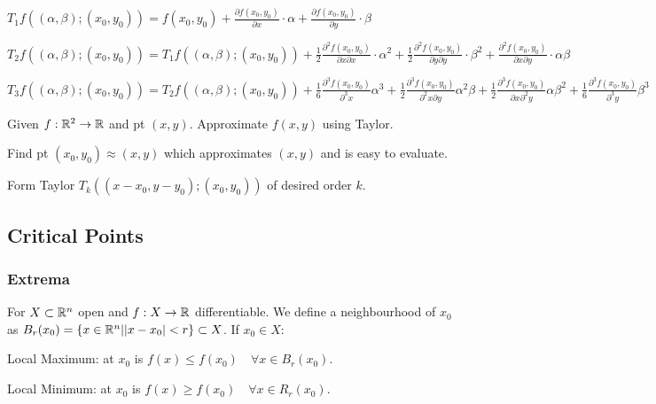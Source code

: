 \begin{compactitem}
    \item $T_1 f((\alpha, \beta); (x_0, y_0)) = f(x_0, y_0) + \frac{\partial f(x_0, y_0)}{\partial x} \cdot \alpha + \frac{\partial f(x_0, y_0)}{\partial y} \cdot \beta$
    \item $T_2 f((\alpha, \beta); (x_0, y_0)) = T_1 f((\alpha, \beta); (x_0, y_0)) + \frac{1}{2} \frac{\partial^2 f(x_0, y_0)}{\partial x \partial x} \cdot \alpha^2 + \frac{1}{2} \frac{\partial^2 f(x_0, y_0)}{\partial y \partial y} \cdot \beta^2 + \frac{\partial^2 f(x_0, y_0)}{\partial x \partial y} \cdot \alpha\beta$
    \item $T_3 f((\alpha, \beta); (x_0, y_0)) = T_2 f((\alpha, \beta); (x_0, y_0)) + \frac{1}{6} \frac{\partial^3 f(x_0, y_0)}{\partial^3 x} \alpha^3 + \frac{1}{2} \frac{\partial^3 f(x_0, y_0)}{\partial^2 x \partial y} \alpha^2 \beta + \frac{1}{2} \frac{\partial^3 f(x_0, y_0)}{\partial x \partial^2 y} \alpha \beta^2 + \frac{1}{6} \frac{\partial^3 f(x_0, y_0)}{\partial^3 y} \beta^3$
\end{compactitem}

Given $f: \mathbb{R}^2 \to \mathbb{R}$ and pt $(x, y)$. Approximate $f(x, y)$ using Taylor.

\begin{compactitem}
    \item Find pt $(x_0, y_0) \approx (x, y)$ which approximates $(x, y)$ and is easy to evaluate.
    \item Form Taylor $T_k((x - x_0, y - y_0); (x_0, y_0))$ of desired order $k$.
\end{compactitem}

\subsection{Critical Points}
\subsubsection{Extrema}
For $X \subset \mathbb{R}^n$ open and $f: X \to \mathbb{R}$ differentiable. We define a neighbourhood of $x_0$ as $B_r(x_0) = \{x \in \mathbb{R}^n | |x - x_0| < r\} \subset X$. If $x_0 \in X$:

\begin{compactdesc}
    \item[Local Maximum:] at $x_0$ is $f(x) \le f(x_0) \quad \forall x \in B_r(x_0)$.
    \item[Local Minimum:] at $x_0$ is $f(x) \ge f(x_0) \quad \forall x \in R_r(x_0)$.
\end{compactdesc}

